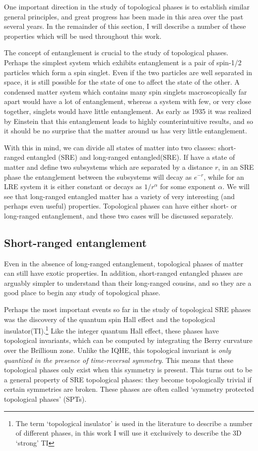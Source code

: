 One important direction in the study of topological phases is to establish similar general principles, and great progress has been made in this area over the past several years. In the remainder of this section, I will describe a number of these properties which will be used throughout this work.

The concept of entanglement is crucial to the study of topological phases. Perhaps the simplest system which exhibits entanglement is a pair of spin-1/2 particles which form a spin singlet. Even if the two particles are well separated in space, it is still possible for the state of one to affect the state of the other. A condensed matter system which contains many spin singlets macroscopically far apart would have a lot of entanglement, whereas a system with few, or very close together, singlets would have little entanglement. As early as 1935 it was realized by Einstein\cite{EPR} that this entanglement leads to highly counterintuitive results, and so it should be no surprise that the matter around us has very little entanglement.

With this in mind, we can divide all states of matter into two classes: short-ranged entangled (SRE) and long-ranged entangled(SRE). If have a state of matter and define two subsystems which are separated by a distance $r$, in an SRE phase the entanglement between the subsystems will decay as $e^{-r}$, while for an LRE system it is either constant or decays as $1/r^{\alpha}$ for some exponent $\alpha$. We will see that long-ranged entangled matter has a variety of very interesting (and perhaps even useful) properties. Topological phases can have either short- or long-ranged entanglement, and these two cases will be discussed separately.

\subsection{Short-ranged entanglement}

Even in the absence of long-ranged entanglement, topological phases of matter can still have exotic properties. In addition, short-ranged entangled phases are arguably simpler to understand than their long-ranged cousins, and so they are a good place to begin any study of topological phase.

Perhaps the most important events so far in the study of topological SRE phases was the discovery of the quantum spin Hall effect\cite{spinHallReview} and the topological insulator(TI).\cite{KaneHasanRMP,QiZhangRMP}\footnote{The term `topological insulator' is used in the literature to describe a number of different phases, in this work I will use it exclusively to describe the 3D `strong' TI}
Like the integer quantum Hall effect, these phases have topological invariants, which can be computed by integrating the Berry curvature over the Brillioun zone. Unlike the IQHE, this topological invariant is \emph{only quantized in the presence of time-reversal symmetry}. This means that these topological phases only exist when this symmetry is present. This turns out to be a general property of SRE topological phases: they become topologically trivial if certain symmetries are broken. These phases are often called `symmetry protected topological phases' (SPTs).

